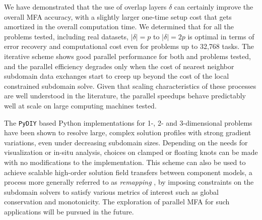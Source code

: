 We have demonstrated that the use of overlap layers $\delta$ can certainly improve the overall MFA accuracy, with a slightly larger one-time setup cost that gets amortized in the overall computation time. We determined that for all the problems tested, including real datasets, $\left| \delta \right|=p$ to $\left| \delta \right|=2p$ is optimal in terms of error recovery and computational cost even for  problems up to 32,768 tasks.
%
%
The iterative scheme shows good parallel performance for both  and  problems tested, and the parallel efficiency degrades only when the cost of nearest neighbor subdomain data exchanges start to creep up beyond the cost of the local constrained subdomain solve. Given that scaling characteristics of these processes are well understood in the literature, the parallel speedups behave predictably well at scale on large computing machines tested.


The \texttt{PyDIY} based Python implementations for 1-, 2- and 3-dimensional problems have been shown to resolve large, complex solution profiles with strong gradient variations, even under decreasing subdomain sizes. Depending on the needs for visualization or in-situ analysis, choices on clamped or floating knots can be made with no modifications to the implementation. This scheme can also be used to achieve scalable high-order solution field transfers between component models, a process more generally referred to as {\em remapping} \cite{dukowicz1987accurate}, by imposing constraints on the subdomain solvers to satisfy various metrics of interest \cite{mahadevan2022} such as global conservation and monotonicity. The exploration of parallel MFA for such applications will be pursued in the future.



